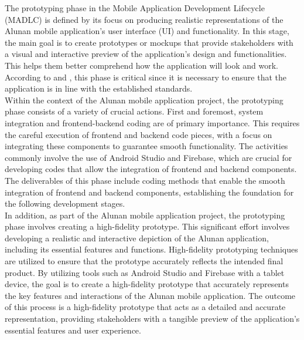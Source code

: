 The prototyping phase in the Mobile Application Development Lifecycle (MADLC) is defined by its focus on producing realistic representations of the Alunan mobile application's user interface (UI) and functionality. In this stage, the main goal is to create prototypes or mockups that provide stakeholders with a visual and interactive preview of the application's design and functionalities. This helps them better comprehend how the application will look and work. According to \textcite{shanmugam19} and \textcite{wambua23}, this phase is critical since it is necessary to ensure that the application is in line with the established standards. \\

Within the context of the Alunan mobile application project, the prototyping phase consists of a variety of crucial actions. First and foremost, system integration and frontend-backend coding are of primary importance. This requires the careful execution of frontend and backend code pieces, with a focus on integrating these components to guarantee smooth functionality. The activities commonly involve the use of Android Studio and Firebase, which are crucial for developing codes that allow the integration of frontend and backend components. The deliverables of this phase include coding methods that enable the smooth integration of frontend and backend components, establishing the foundation for the following development stages. \\

In addition, as part of the Alunan mobile application project, the prototyping phase involves creating a high-fidelity prototype. This significant effort involves developing a realistic and interactive depiction of the Alunan application, including its essential features and functions. High-fidelity prototyping techniques are utilized to ensure that the prototype accurately reflects the intended final product. By utilizing tools such as Android Studio and Firebase with a tablet device, the goal is to create a high-fidelity prototype that accurately represents the key features and interactions of the Alunan mobile application. The outcome of this process is a high-fidelity prototype that acts as a detailed and accurate representation, providing stakeholders with a tangible preview of the application's essential features and user experience.
\pagebreak

